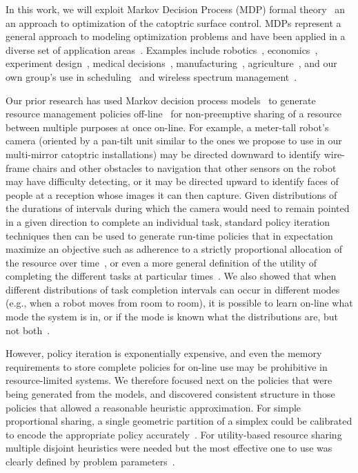 In this work, we will exploit Markov Decision Process (MDP)
formal theory~\cite{puterman} an an approach to optimization of the
catoptric surface control. MDPs represent a general approach
to modeling optimization problems and have been applied in a diverse set of
application areas~\cite{White93}. Examples include robotics~\cite{ab10}, 
economics~\cite{bs98}, experiment design~\cite{kb85},
medical decisions~\cite{ahsr10}, manufacturing~\cite{yyl04},
agriculture~\cite{Kristensen03},
and our own group's use in scheduling~\cite{gtsg08,tggs10}
and wireless spectrum management~\cite{mgc16}.

Our prior research has used Markov decision process
models~\cite{gtsg08} to generate resource management policies
off-line~\cite{gtgs09} for non-preemptive sharing of a resource
between multiple purposes at once on-line.  For example, a meter-tall robot's
camera (oriented by a pan-tilt unit similar to the ones we propose to
use in our multi-mirror catoptric installations) may be directed
downward to identify wire-frame chairs and other obstacles to
navigation that other sensors on the robot may have difficulty
detecting, or it may be directed upward to identify faces of people at
a reception whose images it can then capture. Given distributions of
the durations of intervals during which the camera would need to
remain pointed in a given direction to complete an individual task,
standard policy iteration techniques then can be used to generate
run-time policies that in expectation maximize an objective such as
adherence to a strictly proportional allocation of the resource over
time~\cite{gtsg08}, or even a more general definition of the utility 
of completing the different tasks at particular times~\cite{tggs10}.
We also showed that when different distributions of task completion
intervals can occur in different modes (e.g., when a robot moves
from room to room), it is possible to learn on-line what mode
the system is in, or if the mode is known what the distributions are,
but not both~\cite{gtgsuai10}.

However, policy iteration is exponentially expensive, and even the memory 
requirements to store complete policies for on-line use may be prohibitive 
in resource-limited systems.  We therefore focused next on the policies 
that were being generated from the models, and discovered consistent 
structure in those policies that allowed a reasonable heuristic 
approximation.  For simple proportional sharing, a single geometric partition
of a simplex could be calibrated to encode the appropriate policy accurately~\cite{gtspmgs10}.
For utility-based resource sharing multiple disjoint heuristics were needed but
the most effective one to use was clearly defined by problem parameters~\cite{tblwgs11}.

